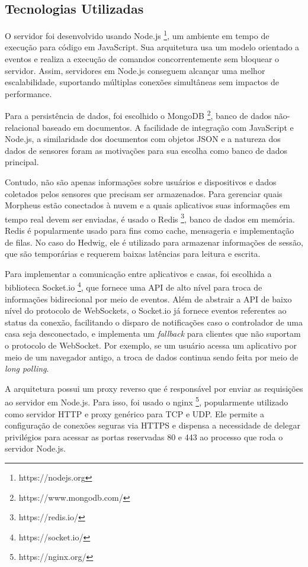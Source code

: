 \subsection{Tecnologias Utilizadas}

O servidor foi desenvolvido usando Node.js \footnote{https://nodejs.org}, um ambiente em tempo de execução para código em JavaScript. Sua arquitetura usa um modelo orientado a eventos e realiza a execução de comandos concorrentemente sem bloquear o servidor. Assim, servidores em Node.js conseguem alcançar uma melhor escalabilidade, suportando múltiplas conexões simultâneas sem impactos de performance.

Para a persistência de dados, foi escolhido o MongoDB \footnote{https://www.mongodb.com/}, banco de dados não-relacional baseado em documentos. A facilidade de integração com JavaScript e Node.js, a similaridade dos documentos com objetos JSON e a natureza dos dados de sensores foram as motivações para sua escolha como banco de dados principal.

Contudo, não são apenas informações sobre usuários e dispositivos e dados coletados pelos sensores que precisam ser armazenados. Para gerenciar quais Morpheus estão conectados à nuvem e a quais aplicativos suas informações em tempo real devem ser enviadas, é usado o Redis \footnote{https://redis.io/}, banco de dados em memória. Redis é popularmente usado para fins como cache, mensageria e implementação de filas. No caso do Hedwig, ele é utilizado para armazenar informações de sessão, que são temporárias e requerem baixas latências para leitura e escrita.

Para implementar a comunicação entre aplicativos e casas, foi escolhida a biblioteca Socket.io \footnote{https://socket.io/}, que fornece uma API de alto nível para troca de informações bidirecional por meio de eventos. Além de abstrair a API de baixo nível do protocolo de WebSockets, o Socket.io já fornece eventos referentes ao status da conexão, facilitando o disparo de notificações caso o controlador de uma casa seja desconectado, e implementa um \emph{fallback} para clientes que não suportam o protocolo de WebSocket. Por exemplo, se um usuário acessa um aplicativo por meio de um navegador antigo, a troca de dados continua sendo feita por meio de \emph{long polling}.

A arquitetura possui um proxy reverso que é responsável por enviar as requisições ao servidor em Node.js. Para isso, foi usado o nginx \footnote{https://nginx.org/}, popularmente utilizado como servidor HTTP e proxy genérico para TCP e UDP. Ele permite a configuração de conexões seguras via HTTPS e dispensa a necessidade de delegar privilégios para acessar as portas reservadas 80 e 443 ao processo que roda o servidor Node.js.

